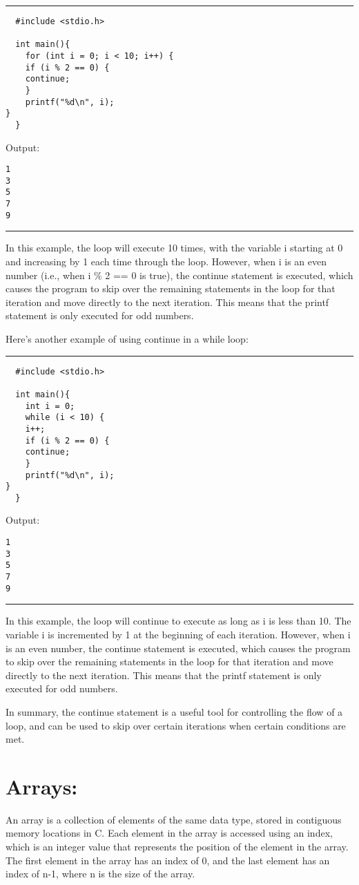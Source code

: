\documentclass[a4paper]{article}
\begin{document}
\noindent\rule{\textwidth}{0.5pt}
\begin{verbatim}
  #include <stdio.h>

  int main(){
    for (int i = 0; i < 10; i++) {
    if (i % 2 == 0) {
	continue;
    }
    printf("%d\n", i);
}
  }
\end{verbatim}
Output:
\begin{verbatim}
1
3
5
7
9
\end{verbatim}

\noindent\rule{\textwidth}{0.5pt}
In this example, the loop will execute 10 times, with the variable i starting at
0 and increasing by 1 each time through the loop. However, when i is an even
number (i.e., when i \% 2 == 0 is true), the continue statement is executed,
which causes the program to skip over the remaining statements in the loop for
that iteration and move directly to the next iteration. This means that the
printf statement is only executed for odd numbers.


Here's another example of using continue in a while loop:

\noindent\rule{\textwidth}{0.5pt}
\begin{verbatim}
  #include <stdio.h>

  int main(){
    int i = 0;
    while (i < 10) {
    i++;
    if (i % 2 == 0) {
	continue;
    }
    printf("%d\n", i);
}
  }
\end{verbatim}
Output:
\begin{verbatim}
1
3
5
7
9
\end{verbatim}

\noindent\rule{\textwidth}{0.5pt}
In this example, the loop will continue to execute as long as i is less
than 10. The variable i is incremented by 1 at the beginning of each
iteration. However, when i is an even number, the continue statement is
executed, which causes the program to skip over the remaining statements in the
loop for that iteration and move directly to the next iteration. This means that
the printf statement is only executed for odd numbers.


In summary, the continue statement is a useful tool for controlling the flow of
a loop, and can be used to skip over certain iterations when certain conditions
are met.

\section{Arrays:}
\label{sec:org1d0a0a3}
An array is a collection of elements of the same data type, stored in contiguous
memory locations in C. Each element in the array is accessed using an index,
which is an integer value that represents the position of the element in the
array. The first element in the array has an index of 0, and the last element
has an index of n-1, where n is the size of the array.
\end{document}
